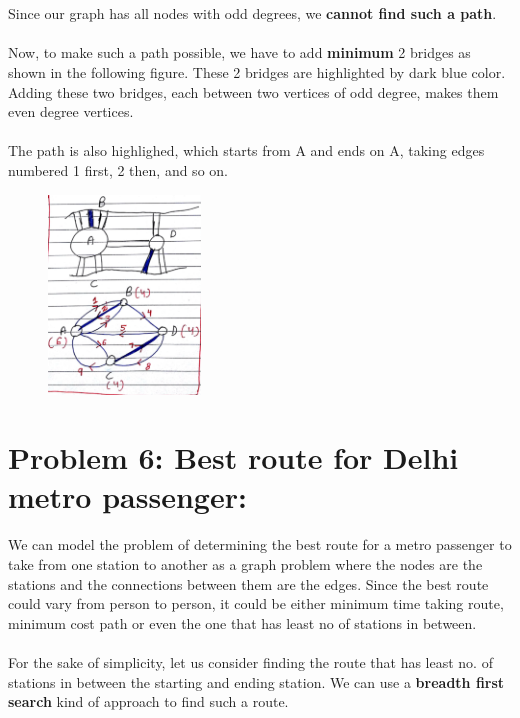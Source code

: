 \documentclass[12pt]{report}
\begin{document}
\\ \\ 
Since our graph has all nodes with odd degrees, we \textbf{cannot find such a path}.
\\ \\ 
Now, to make such a path possible, we have to add \textbf{minimum} 2 bridges as shown in the following figure. These 2 bridges are highlighted by dark blue color. Adding these two bridges, each between two vertices of odd degree, makes them even degree vertices. 
\\ \\ 
The path is also highlighed, which starts from A and ends on A, taking edges numbered 1 first, 2 then, and so on. 
\begin{figure}[H]
	\vspace{0pt}
	\includegraphics[height = 150pt, keepaspectratio]{Snapshots/q5_2.png}
\end{figure} 
\section{Problem 6: Best route for Delhi metro passenger:}
We can model the problem of determining the best route for a metro passenger to take from one station to another as a graph problem where the nodes are the stations and the connections between them are the edges. Since the best route could vary from person to person, it could be either minimum time taking route, minimum cost path or even the one that has least no of stations in between.
\\ \\
For the sake of simplicity, let us consider finding the route that has least no. of stations in between the starting and ending station. We can use a \textbf{breadth first search} kind of approach to find such a route. 
\\ \\
\end{document}
